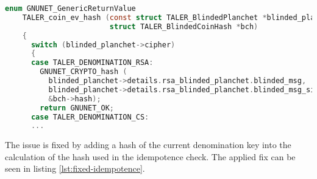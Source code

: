 \begin{lstlisting}[style=bfh-c,language=C, caption={Idempotency check on RSA}, label={lst:rsa-idempotence}]
    enum GNUNET_GenericReturnValue
    TALER_coin_ev_hash (const struct TALER_BlindedPlanchet *blinded_planchet,
                        struct TALER_BlindedCoinHash *bch)
    {
      switch (blinded_planchet->cipher)
      {
      case TALER_DENOMINATION_RSA:
        GNUNET_CRYPTO_hash (
          blinded_planchet->details.rsa_blinded_planchet.blinded_msg,
          blinded_planchet->details.rsa_blinded_planchet.blinded_msg_size,
          &bch->hash);
        return GNUNET_OK;
      case TALER_DENOMINATION_CS:
      ...

\end{lstlisting}

The issue is fixed by adding a hash of the current denomination key into the calculation of the hash used in the \gls{idempotence} check.
The applied fix can be seen in listing \ref{lst:fixed-idempotence}.

